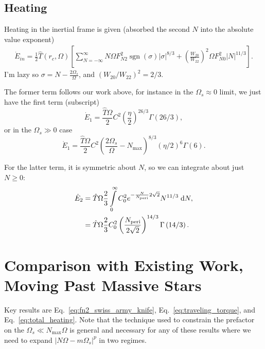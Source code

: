 \documentclass[11pt,
        usenames, %
        dvipsnames %
    ]{article}
\newcommand*{\abs}[1]{\left|#1\right|}
\newcommand*{\p}[1]{\left(#1\right)}
\newcommand*{\s}[1]{\left[#1\right]}
\DeclareMathOperator{\sgn}{sgn}
\begin{document}
\subsection{Heating}

Heating in the inertial frame is given (absorbed the second $N$ into the
absolute value exponent)
\begin{align}
     \dot{E}_{in} = \frac{1}{2}\hat{T}\p{r_c, \Omega}\s{
         \sum\limits_{N = -\infty}^\infty
            N\Omega F_{N2}^2 \sgn \p{\sigma} \abs{\sigma}^{8/3}
            + \p{\frac{W_{20}}{W_{22}}}^2\Omega F_{N0}^2 \abs{N}^{11/3}}.
\end{align}
I'm lazy so $\sigma = N - \frac{2\Omega_s}{\Omega}$, and $\p{W_{20} /
W_{22}}^2 = 2/3$.

The former term follows our work above, for instance in the $\Omega_s \approx 0$
limit, we just have the first term (subscript)
\begin{equation}
    \dot{E}_1 = \frac{\hat{T}\Omega }{2} C^2
        \p{\frac{\eta}{2}}^{26/3}\Gamma\p{26/3},
\end{equation}
or in the $\Omega_s \gg 0$ case
\begin{equation}
    \dot{E}_1 = \frac{\hat{T}\Omega}{2} C^2
        \p{\frac{2\Omega_s}{\Omega} - N_{\max}}^{8/3}
            (\eta/2)^{6} \Gamma\p{6}.
\end{equation}

For the latter term, it is symmetric about $N$, so we can integrate about just
$N \geq 0$:
\begin{align}
    \dot{E}_2 &= \hat{T}\Omega \frac{2}{3} \int\limits_0^\infty
            C_0^2 e^{-\frac{N}{N_{\rm peri}}2\sqrt{2}}N^{11/3}\;\mathrm{d}N,\\
        &= \hat{T} \Omega \frac{2}{3} C_0^2
            \p{\frac{N_{\rm peri}}{2\sqrt{2}}}^{14/3}
            \Gamma\p{14/3}.
\end{align}

\section{Comparison with Existing Work, Moving Past Massive Stars}

Key results are Eq.~\eqref{eq:fn2_swiss_army_knife},
Eq.~\eqref{eq:traveling_torque}, and Eq.~\eqref{eq:total_heating}. Note that the
technique used to constrain the prefactor on the $\Omega_s \ll N_{\max}\Omega$
is general and necessary for any of these results where we need to expand
$\abs{N\Omega - m\Omega_s}^p$ in two regimes.
\end{document}
